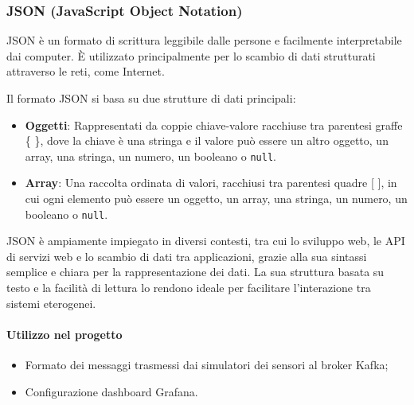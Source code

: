 \subsubsection{JSON (JavaScript Object Notation)}
JSON è un formato di scrittura leggibile dalle persone e facilmente interpretabile dai computer. È utilizzato principalmente per lo scambio di dati strutturati attraverso le reti, come Internet. 

Il formato JSON si basa su due strutture di dati principali:

\begin{itemize}
  \item \textbf{Oggetti}: Rappresentati da coppie chiave-valore racchiuse tra parentesi graffe \{ \}, dove la chiave è una stringa e il valore può essere un altro oggetto, un array, una stringa, un numero, un booleano o \texttt{null}.
  \item \textbf{Array}: Una raccolta ordinata di valori, racchiusi tra parentesi quadre [ ], in cui ogni elemento può essere un oggetto, un array, una stringa, un numero, un booleano o \texttt{null}.
\end{itemize}

JSON è ampiamente impiegato in diversi contesti, tra cui lo sviluppo web, le API di servizi web e lo scambio di dati tra applicazioni, grazie alla sua sintassi semplice e chiara per la rappresentazione dei dati. La sua struttura basata su testo e la facilità di lettura lo rendono ideale per facilitare l'interazione tra sistemi eterogenei.

\paragraph{Utilizzo nel progetto}
\begin{itemize}
  \item Formato dei messaggi trasmessi dai simulatori dei sensori al broker Kafka;
  \item Configurazione dashboard Grafana.
\end{itemize}
